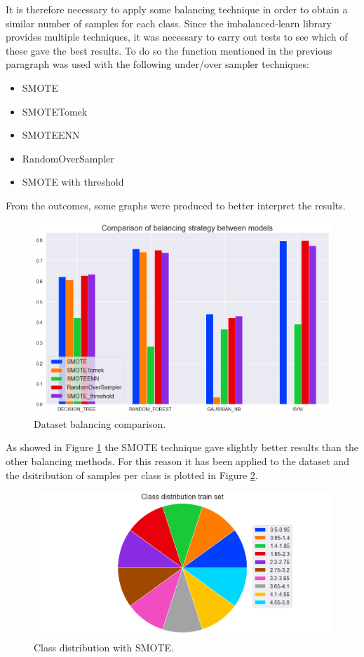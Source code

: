 \documentclass[../main]{subfiles}
\begin{document}
It is therefore necessary to apply some balancing technique in order to obtain a similar number of samples for each class.
Since the imbalanced-learn \cite{JMLR:v18:16-365} library provides multiple techniques, it was necessary to carry out tests to see which of these gave the best results.
To do so the function mentioned in the previous paragraph was used with the following under/over sampler techniques:
\begin{itemize}
    \item SMOTE
    \item SMOTETomek
    \item SMOTEENN
    \item RandomOverSampler
    \item SMOTE with threshold
\end{itemize}

From the outcomes, some graphs were produced to better interpret the results.
\begin{figure}[h]
    \center
    \includegraphics[width=0.6\linewidth]{figures/imbalance_evaluation.png}
    \caption{Dataset balancing comparison.}
    \label{fig:balance_evaluation}
\end{figure}

As showed in Figure \ref{fig:balance_evaluation} the SMOTE technique gave slightly better results than the other balancing methods.
For this reason it has been applied to the dataset and the dsitribution of samples per class is plotted in Figure \ref{fig:class_distribuition_balance}.
\begin{figure}[h]
    \center
    \includegraphics[width=0.6\linewidth]{figures/class_distribution_smote.png}
    \caption{Class distribution  with SMOTE.}
    \label{fig:class_distribuition_balance}
\end{figure}
\newpage
\end{document}
